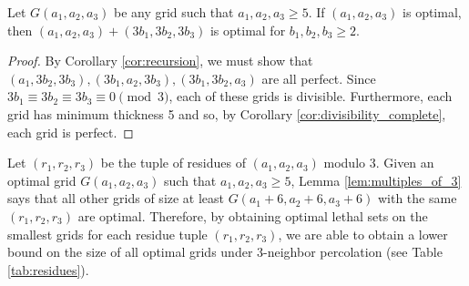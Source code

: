 
\begin{lem}
\label{lem:multiples_of_3}
Let $G(a_1,a_2,a_3)$ be any grid such that $a_1, a_2, a_3 \geq 5$. If $(a_1,a_2,a_3)$ is optimal, then $(a_1,a_2,a_3) + (3b_1,3b_2,3b_3)$ is optimal for $b_1,b_2,b_3 \geq 2$. 
\end{lem}

\begin{proof}
By Corollary \ref{cor:recursion}, we must show that $(a_1,3b_2,3b_3), (3b_1,a_2,3b_3), (3b_1,3b_2,a_3)$ are all perfect. Since $3b_1 \equiv 3b_2 \equiv 3b_3 \equiv 0 \pmod 3$, each of these grids is divisible. Furthermore, each grid has minimum thickness 5 and so, by Corollary \ref{cor:divisibility_complete}, each grid is perfect.
\end{proof}

Let $(r_1,r_2,r_3)$ be the tuple of residues of $(a_1,a_2,a_3)$ modulo 3. Given an optimal grid $G(a_1,a_2,a_3)$ such that $a_1,a_2,a_3 \ge 5$, Lemma \ref{lem:multiples_of_3} says that all other grids of size at least $G(a_1+6,a_2+6,a_3+6)$ with the same $(r_1,r_2,r_3)$ are optimal. Therefore, by obtaining optimal lethal sets on the smallest grids for each residue tuple $(r_1,r_2,r_3)$, we are able to obtain a lower bound on the size of all optimal grids under 3-neighbor percolation (see Table \ref{tab:residues}).


